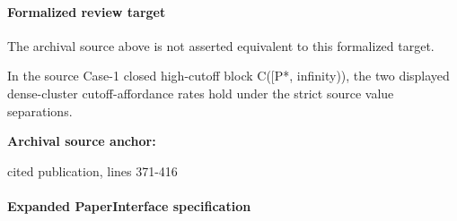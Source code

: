 \documentclass[10pt]{article}
\begin{document}
\paragraph{Formalized review target}
The archival source above is not asserted equivalent to this formalized target.
\begin{ReviewVerbatim}
In the source Case-1 closed high-cutoff block C([P*, infinity)), the two displayed dense-cluster cutoff-affordance rates hold under the strict source value separations.
\end{ReviewVerbatim}

\textbf{Archival source anchor:} {\footnotesize\raggedright cited publication, lines 371-\allowbreak{}416\par}
\paragraph{Expanded PaperInterface specification}
\end{document}
